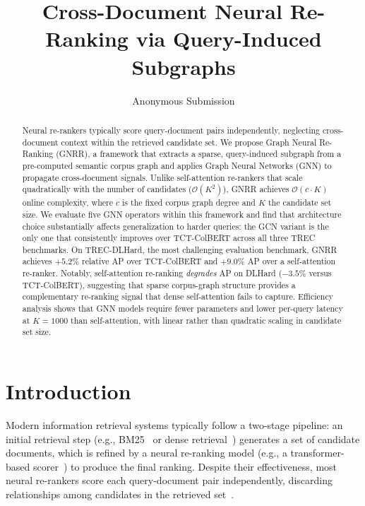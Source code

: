 \documentclass[runningheads]{llncs}
\newcommand{\ModelName}{GNRR\xspace}
\begin{document}
%
\title{Cross-Document Neural Re-Ranking via Query-Induced Subgraphs}
%
%
\author{Anonymous Submission}
%
\authorrunning{}
%
\institute{}
%
\maketitle
%
\begin{abstract}
Neural re-rankers typically score query-document pairs independently, neglecting cross-document context within the retrieved candidate set.
We propose Graph Neural Re-Ranking (\ModelName), a framework that extracts a sparse, query-induced subgraph from a pre-computed semantic corpus graph and applies Graph Neural Networks (GNN) to propagate cross-document signals.
Unlike self-attention re-rankers that scale quadratically with the number of candidates ($\mathcal{O}(K^2)$), \ModelName achieves $\mathcal{O}(c \cdot K)$ online complexity, where $c$ is the fixed corpus graph degree and $K$ the candidate set size.
We evaluate five GNN operators within this framework and find that architecture choice substantially affects generalization to harder queries: the GCN variant is the only one that consistently improves over TCT-ColBERT across all three TREC benchmarks.
On TREC-DLHard, the most challenging evaluation benchmark, \ModelName achieves $+5.2\%$ relative AP over TCT-ColBERT and $+9.0\%$ AP over a self-attention re-ranker.
Notably, self-attention re-ranking \emph{degrades} AP on DLHard ($-3.5\%$ versus TCT-ColBERT), suggesting that sparse corpus-graph structure provides a complementary re-ranking signal that dense self-attention fails to capture.
Efficiency analysis shows that GNN models require fewer parameters and lower per-query latency at $K=1000$ than self-attention, with linear rather than quadratic scaling in candidate set size.
\end{abstract}


\section{Introduction}
Modern information retrieval systems typically follow a two-stage pipeline: an initial retrieval step (e.g., BM25~\cite{bm25} or dense retrieval~\cite{colbert}) generates a set of candidate documents, which is refined by a neural re-ranking model (e.g., a transformer-based scorer~\cite{tctcolbert,vaswani2017attention}) to produce the final ranking.
Despite their effectiveness, most neural re-rankers score each query-document pair independently, discarding relationships among candidates in the retrieved set~\cite{monobert,RepBert}.
\end{document}
